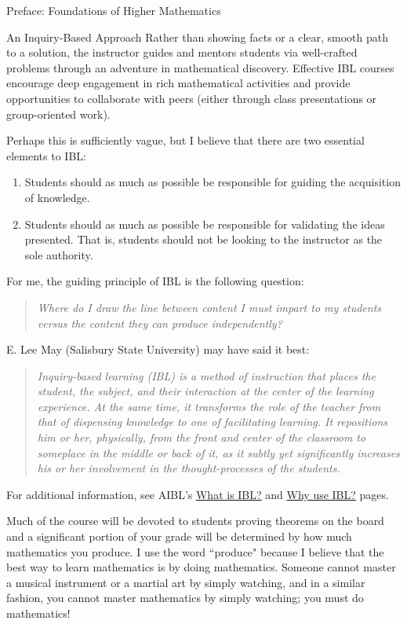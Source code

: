 \documentclass[11pt]{article}
\begin{document}
\begin{section}{Preface: Foundations of Higher Mathematics}
\begin{subsection}{An Inquiry-Based Approach}
\noindent Rather than showing facts or a clear, smooth path to a solution, the instructor guides and mentors students via well-crafted problems through an adventure in mathematical discovery.  Effective IBL courses encourage deep engagement in rich mathematical activities and provide opportunities to collaborate with peers (either through class presentations or group-oriented work).

Perhaps this is sufficiently vague, but I believe that there are two essential elements to IBL:

\begin{enumerate}
\item Students should as much as possible be responsible for guiding the acquisition of knowledge.
\item Students should as much as possible be responsible for validating the ideas presented.  That is, students should not be looking to the instructor as the sole authority.
\end{enumerate}

\noindent For me, the guiding principle of IBL is the following question:

\begin{quote}
\emph{Where do I draw the line between content I must impart to my students versus the content they can produce independently?}
\end{quote}

\noindent E. Lee May (Salisbury State University) may have said it best:

\begin{quote}
\emph{Inquiry-based learning (IBL) is a method of instruction that places the student, the subject, and their interaction at the center of the learning experience.  At the same time, it transforms the role of the teacher from that of dispensing knowledge to one of facilitating learning.  It repositions him or her, physically, from the front and center of the classroom to someplace in the middle or back of it, as it subtly yet significantly increases his or her involvement in the thought-processes of the students.}
\end{quote}

\noindent For additional information, see AIBL's \href{http://www.inquirybasedlearning.org/?page=What_is_IBL}{What is IBL?} and \href{http://www.inquirybasedlearning.org/?page=Why_Use_IBL}{Why use IBL?} pages.

Much of the course will be devoted to students proving theorems on the board and a significant portion of your grade will be determined by how much mathematics you produce. I use the word ``produce" because I believe that the best way to learn mathematics is by doing mathematics. Someone cannot master a musical instrument or a martial art by simply watching, and in a similar fashion, you cannot master mathematics by simply watching; you must do mathematics!


\end{subsection}
\end{section}
\end{document}
